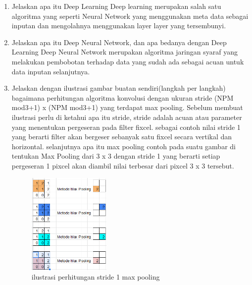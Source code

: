 \begin{enumerate}
    \item Jelaskan apa itu Deep Learning
    \hfill\break
    Deep learning merupakan salah satu algoritma yang seperti Neural Network yang menggunakan meta data sebagai inputan dan mengolahnya menggunakan layer layer yang tersembunyi.

    \item Jelaskan apa itu Deep Neural Network, dan apa bedanya dengan Deep Learning
    \hfill\break
    Deep Neural Network merupakan algoritma jaringan syaraf yang melakukan pembobotan terhadap data yang sudah ada sebagai acuan untuk data inputan selanjutnya. 

    \item Jelaskan dengan ilustrasi gambar buatan sendiri(langkah per langkah) bagaimana perhitungan algoritma konvolusi dengan ukuran stride (NPM mod3+1) x (NPM mod3+1) yang terdapat max pooling.
    \hfill\break
    Sebelum membuat ilustrasi perlu di ketahui apa itu stride, stride adalah acuan atau parameter yang menentukan pergeseran pada ﬁlter ﬁxcel. sebagai contoh nilai stride 1 yang berarti ﬁlter akan bergeser sebanyak satu ﬁxcel secara vertikal dan horizontal. selanjutnya apa itu max pooling contoh pada suatu gambar di tentukan Max Pooling dari 3 x 3 dengan stride 1 yang berarti setiap pergeseran 1 pixcel akan diambil nilai terbesar dari pixcel 3 x 3 tersebut.
    \begin{figure}[H]
	    \centering
	    \includegraphics[width=4cm]{figures/1174077/7/teori_10.PNG}
	    \caption{ilustrasi perhitungan stride 1 max pooling}
    \end{figure}
\end{enumerate}


